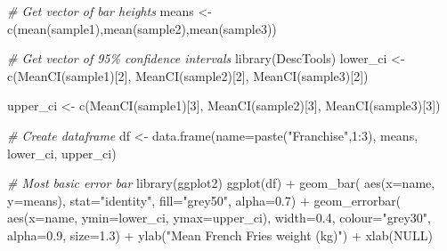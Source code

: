 \documentclass[
]{book}
\newenvironment{Shaded}{\begin{snugshade}}{\end{snugshade}}
\newcommand{\AttributeTok}[1]{\textcolor[rgb]{0.77,0.63,0.00}{#1}}
\newcommand{\CommentTok}[1]{\textcolor[rgb]{0.56,0.35,0.01}{\textit{#1}}}
\newcommand{\ConstantTok}[1]{\textcolor[rgb]{0.00,0.00,0.00}{#1}}
\newcommand{\DecValTok}[1]{\textcolor[rgb]{0.00,0.00,0.81}{#1}}
\newcommand{\FloatTok}[1]{\textcolor[rgb]{0.00,0.00,0.81}{#1}}
\newcommand{\FunctionTok}[1]{\textcolor[rgb]{0.00,0.00,0.00}{#1}}
\newcommand{\NormalTok}[1]{#1}
\newcommand{\OtherTok}[1]{\textcolor[rgb]{0.56,0.35,0.01}{#1}}
\newcommand{\SpecialCharTok}[1]{\textcolor[rgb]{0.00,0.00,0.00}{#1}}
\newcommand{\StringTok}[1]{\textcolor[rgb]{0.31,0.60,0.02}{#1}}
\begin{document}
\begin{Shaded}
\begin{Highlighting}[]
\CommentTok{\# Get vector of bar heights}
\NormalTok{means }\OtherTok{\textless{}{-}} \FunctionTok{c}\NormalTok{(}\FunctionTok{mean}\NormalTok{(sample1),}\FunctionTok{mean}\NormalTok{(sample2),}\FunctionTok{mean}\NormalTok{(sample3))}

\CommentTok{\# Get vector of 95\% confidence intervals}
\FunctionTok{library}\NormalTok{(DescTools)}
\NormalTok{lower\_ci }\OtherTok{\textless{}{-}} \FunctionTok{c}\NormalTok{(}\FunctionTok{MeanCI}\NormalTok{(sample1)[}\DecValTok{2}\NormalTok{],}
              \FunctionTok{MeanCI}\NormalTok{(sample2)[}\DecValTok{2}\NormalTok{],}
              \FunctionTok{MeanCI}\NormalTok{(sample3)[}\DecValTok{2}\NormalTok{])}

\NormalTok{upper\_ci }\OtherTok{\textless{}{-}} \FunctionTok{c}\NormalTok{(}\FunctionTok{MeanCI}\NormalTok{(sample1)[}\DecValTok{3}\NormalTok{],}
              \FunctionTok{MeanCI}\NormalTok{(sample2)[}\DecValTok{3}\NormalTok{],}
              \FunctionTok{MeanCI}\NormalTok{(sample3)[}\DecValTok{3}\NormalTok{])}

\CommentTok{\# Create dataframe}
\NormalTok{df }\OtherTok{\textless{}{-}} \FunctionTok{data.frame}\NormalTok{(}\AttributeTok{name=}\FunctionTok{paste}\NormalTok{(}\StringTok{"Franchise"}\NormalTok{,}\DecValTok{1}\SpecialCharTok{:}\DecValTok{3}\NormalTok{),}
\NormalTok{                   means,}
\NormalTok{                   lower\_ci,}
\NormalTok{                   upper\_ci)}

\CommentTok{\# Most basic error bar}
\FunctionTok{library}\NormalTok{(ggplot2)}
\FunctionTok{ggplot}\NormalTok{(df) }\SpecialCharTok{+}
    \FunctionTok{geom\_bar}\NormalTok{( }\FunctionTok{aes}\NormalTok{(}\AttributeTok{x=}\NormalTok{name, }\AttributeTok{y=}\NormalTok{means), }\AttributeTok{stat=}\StringTok{"identity"}\NormalTok{, }\AttributeTok{fill=}\StringTok{"grey50"}\NormalTok{, }\AttributeTok{alpha=}\FloatTok{0.7}\NormalTok{) }\SpecialCharTok{+}
    \FunctionTok{geom\_errorbar}\NormalTok{( }\FunctionTok{aes}\NormalTok{(}\AttributeTok{x=}\NormalTok{name, }\AttributeTok{ymin=}\NormalTok{lower\_ci, }\AttributeTok{ymax=}\NormalTok{upper\_ci), }
                   \AttributeTok{width=}\FloatTok{0.4}\NormalTok{, }\AttributeTok{colour=}\StringTok{"grey30"}\NormalTok{, }\AttributeTok{alpha=}\FloatTok{0.9}\NormalTok{, }\AttributeTok{size=}\FloatTok{1.3}\NormalTok{) }\SpecialCharTok{+} 
    \FunctionTok{ylab}\NormalTok{(}\StringTok{"Mean French Fries weight (kg)"}\NormalTok{) }\SpecialCharTok{+}
    \FunctionTok{xlab}\NormalTok{(}\ConstantTok{NULL}\NormalTok{)}
\end{Highlighting}
\end{Shaded}
\end{document}
